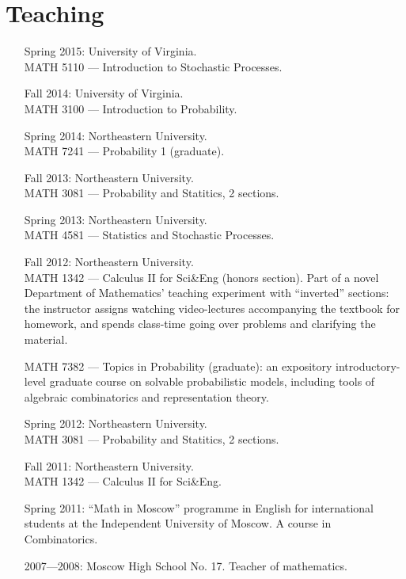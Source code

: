 \documentclass[letterpaper,11pt]{article}
\begin{document}
\section*{Teaching}

\begin{itemize}
	\item[Spring 2015:]   
	University of Virginia. \\
	MATH 5110 --- Introduction to Stochastic Processes.

	\item[Fall 2014:]   
	University of Virginia. \\
	MATH 3100 --- Introduction to Probability.

  \item[Spring 2014:]   
  Northeastern University. \\
  MATH 7241 --- 
  Probability 1 (graduate).

  \item[Fall 2013:]   
  Northeastern University. \\
  MATH 3081 --- 
  Probability and Statitics, 2 sections.
  \item[Spring 2013:] 
  Northeastern University. 
  \\
  MATH 4581 --- Statistics and Stochastic Processes.
  \item[Fall 2012:]
  Northeastern University. 
  \\
  MATH 1342 --- 
  Calculus II for Sci\&Eng (honors section). Part of a novel Department of Mathematics' teaching experiment with ``inverted'' sections: the instructor assigns watching video-lectures accompanying the textbook for homework, and spends class-time going over problems and clarifying the material.

  MATH 7382 --- Topics in Probability (graduate): an expository introductory-level graduate course on solvable probabilistic models, including tools of algebraic combinatorics and representation theory.

  \item[Spring 2012:] 
  Northeastern University. \\
  MATH 3081 --- 
  Probability and Statitics, 2 sections.
  \item[Fall 2011:]
  Northeastern University.\\
  MATH 1342 --- 
  Calculus II for Sci\&Eng.
  \item[Spring 2011:]
  ``Math in Moscow'' programme in English for international students at the Independent University of Moscow. A course in Combinatorics.

  \item[2007---2008:]
  Moscow High School No. 17.
  Teacher of mathematics.
\end{itemize}
\end{document}

